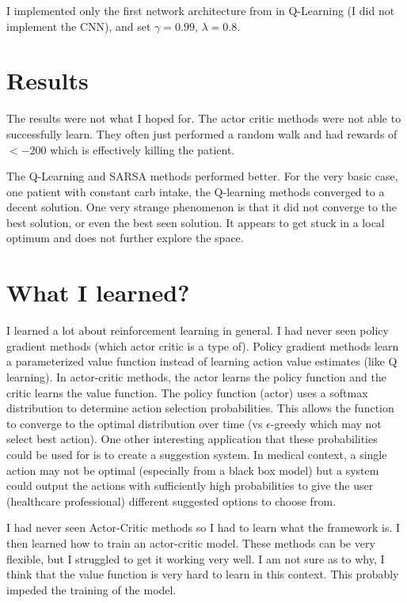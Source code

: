 \documentclass[11pt]{article}
\begin{document}
I implemented only the first network architecture from in Q-Learning (I did not implement the CNN), and set $\gamma = 0.99$, $\lambda = 0.8$.

\section{Results}
The results were not what I hoped for.
The actor critic methods were not able to successfully learn. 
They often just performed a random walk and had rewards of $<-200$ which is effectively killing the patient.

The Q-Learning and SARSA methods performed better.
For the very basic case, one patient with constant carb intake, the Q-learning methods converged to a decent solution.
One very strange phenomenon is that it did not converge to the best solution, or even the best seen solution.
It appears to get stuck in a local optimum and does not further explore the space. 

\section{What I learned?}
I learned a lot about reinforcement learning in general.
I had never seen policy gradient methods (which actor critic is a type of).
Policy gradient methods learn a parameterized value function instead of learning action value estimates (like Q learning).
In actor-critic methods, the actor learns the policy function and the critic learns the value function.
The policy function (actor) uses a softmax distribution to determine action selection probabilities.
This allows the function to converge to the optimal distribution over time (vs $\epsilon$-greedy which may not select best action).
One other interesting application that these probabilities could be used for is to create a suggestion system.
In medical context, a single action may not be optimal (especially from a black box model) but a system could output the actions with sufficiently high probabilities
to give the user (healthcare professional) different suggested options to choose from.

I had never seen Actor-Critic methods so I had to learn what the framework is.
I then learned how to train an actor-critic model. 
These methods can be very flexible, but I struggled to get it working very well.
I am not sure as to why, I think that the value function is very hard to learn in this context.
This probably impeded the training of the model. 
\end{document}
